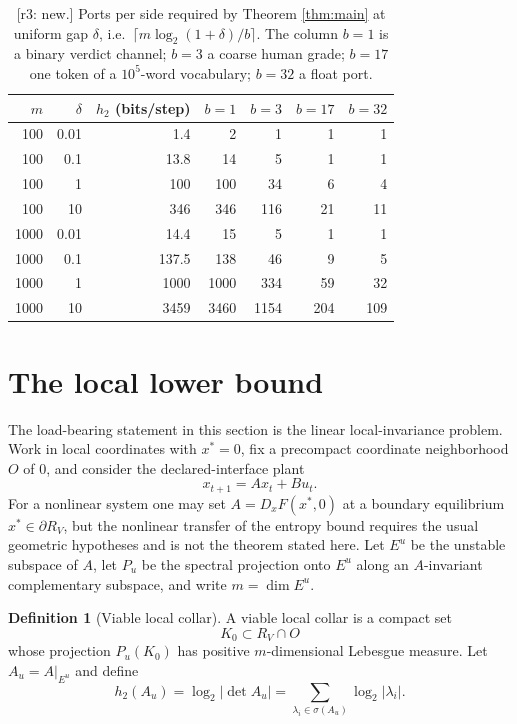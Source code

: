 \documentclass[11pt]{article}
\theoremstyle{definition}
\newtheorem{definition}{Definition}[section]
\theoremstyle{remark}
\newcommand{\RV}{R_V}
\newcommand{\Eu}{E^u}
\newcommand{\Pu}{P_u}
\newcommand{\Au}{A_u}
\newcommand{\htwo}{h_2}
\newcommand{\revnote}[1]{\textcolor{red!60!black}{[r3: #1]}}
\begin{document}
\begin{table}[ht]
\centering
\small
\begin{tabular}{rrrrrrr}
\toprule
$m$ & $\delta$ & $\htwo$ (bits/step) & $b=1$ & $b=3$ & $b=17$ & $b=32$ \\
\midrule
100 & 0.01 & 1.4 & 2 & 1 & 1 & 1 \\
100 & 0.1 & 13.8 & 14 & 5 & 1 & 1 \\
100 & 1 & 100 & 100 & 34 & 6 & 4 \\
100 & 10 & 346 & 346 & 116 & 21 & 11 \\
1000 & 0.01 & 14.4 & 15 & 5 & 1 & 1 \\
1000 & 0.1 & 137.5 & 138 & 46 & 9 & 5 \\
1000 & 1 & 1000 & 1000 & 334 & 59 & 32 \\
1000 & 10 & 3459 & 3460 & 1154 & 204 & 109 \\
\bottomrule
\end{tabular}
\caption{\revnote{new.} Ports per side required by Theorem \ref{thm:main} at uniform gap $\delta$, i.e.\ $\lceil m\log_2(1+\delta)/b\rceil$. The column $b=1$ is a binary verdict channel; $b=3$ a coarse human grade; $b=17$ one token of a $10^5$-word vocabulary; $b=32$ a float port.}
\label{tab:ports}
\end{table}

\section{The local lower bound}

The load-bearing statement in this section is the linear local-invariance problem. Work in local coordinates with $x^*=0$, fix a precompact coordinate neighborhood $O$ of $0$, and consider the declared-interface plant
\begin{equation}
x_{t+1}=Ax_t+Bu_t. \label{eq:lin}
\end{equation}
For a nonlinear system one may set $A=D_xF(x^*,0)$ at a boundary equilibrium $x^*\in\partial\RV$, but the nonlinear transfer of the entropy bound requires the usual geometric hypotheses and is not the theorem stated here. Let $\Eu$ be the unstable subspace of $A$, let $\Pu$ be the spectral projection onto $\Eu$ along an $A$-invariant complementary subspace, and write $m=\dim\Eu$.

\begin{definition}[Viable local collar]
A viable local collar is a compact set
\begin{equation}
K_0\subset\RV\cap O
\end{equation}
whose projection $\Pu(K_0)$ has positive $m$-dimensional Lebesgue measure. Let $\Au=A|_{\Eu}$ and define
\begin{equation}
\htwo(\Au)=\log_2|\det\Au|=\sum_{\lambda_i\in\sigma(\Au)}\log_2|\lambda_i|. \label{eq:h2}
\end{equation}
\end{definition}
\end{document}

